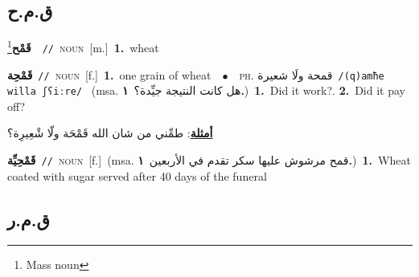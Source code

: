 \documentclass[10pt,a4paper,twoside]{article} %
\begin{document}
\begin{multicols}{2}
\vspace{-3mm}
\subsection*{\color{blue}\foreignlanguage{arabic}{ق.م.ح}\color{blue}{}} 

{\setlength\topsep{0pt}\textbf{\foreignlanguage{arabic}{قَمْح}}\footnote{Mass noun}\ \ {\color{gray}\texttt{//}\color{black}}\ \textsc{noun}\ [m.]\ \textbf{1.}~wheat\ } \vspace{2mm}

{\setlength\topsep{0pt}\textbf{\foreignlanguage{arabic}{قَمْحِة}}\ {\color{gray}\texttt{//}\color{black}}\ \textsc{noun}\ [f.]\ \textbf{1.}~one grain of wheat\ \ $\bullet$\ \ \textsc{ph.} \color{gray} \foreignlanguage{arabic}{قمحة ولَا شعيرة}\color{black}\ {\color{gray}\texttt{/{\sffamily (q)amħe willa ʃʕiːre}/}\color{black}}\ \color{gray} (msa. \foreignlanguage{arabic}{هل كانت النتيجة جيِّدة؟}~\foreignlanguage{arabic}{\textbf{١.}})\color{black}\ \textbf{1.}~Did it work?.  \textbf{2.}~Did it pay off?\  \begin{flushright}\color{gray}\foreignlanguage{arabic}{\textbf{\underline{\foreignlanguage{arabic}{أمثلة}}}: طمِّني من شان الله قَمْحَة ولّا شْعِيرِة؟}\end{flushright}\color{black}} \vspace{2mm}

{\setlength\topsep{0pt}\textbf{\foreignlanguage{arabic}{قَمْحِيِّة}}\ {\color{gray}\texttt{//}\color{black}}\ \textsc{noun}\ [f.]\ \color{gray}(msa. \foreignlanguage{arabic}{قمح مرشوش عليها سكر تقدم في الأربعين}~\foreignlanguage{arabic}{\textbf{١.}})\color{black}\ \textbf{1.}~Wheat coated with sugar served after 40 days of the funeral\ } \vspace{2mm}

\vspace{-3mm}
\subsection*{\color{blue}\foreignlanguage{arabic}{ق.م.ر}\color{blue}{}} 


\end{multicols}
\end{document}
